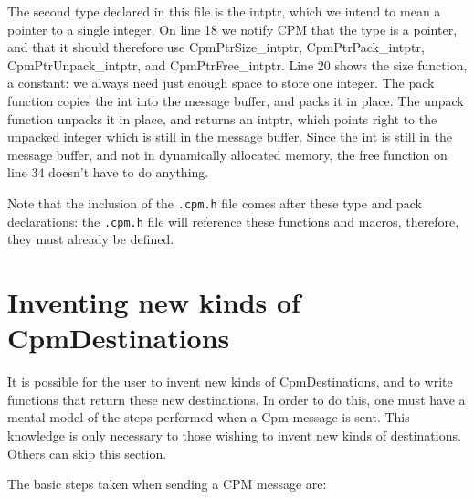 The second type declared in this file is the intptr, which we intend
to mean a pointer to a single integer.  On line 18 we notify CPM that
the type is a pointer, and that it should therefore use
CpmPtrSize\_intptr, CpmPtrPack\_intptr, CpmPtrUnpack\_intptr, and
CpmPtrFree\_intptr.  Line 20 shows the size function, a constant: we
always need just enough space to store one integer.  The pack function
copies the int into the message buffer, and packs it in place.  The
unpack function unpacks it in place, and returns an intptr, which
points right to the unpacked integer which is still in the message
buffer.  Since the int is still in the message buffer, and not in
dynamically allocated memory, the free function on line 34 doesn't
have to do anything.

Note that the inclusion of the {\tt .cpm.h} file comes after these
type and pack declarations: the {\tt .cpm.h} file will reference these
functions and macros, therefore, they must already be defined.

\section{Inventing new kinds of CpmDestinations}

It is possible for the user to invent new kinds of CpmDestinations,
and to write functions that return these new destinations.  In order
to do this, one must have a mental model of the steps performed when a
Cpm message is sent.  This knowledge is only necessary to those
wishing to invent new kinds of destinations.  Others can skip this
section.

\pagebreak
The basic steps taken when sending a CPM message are:

